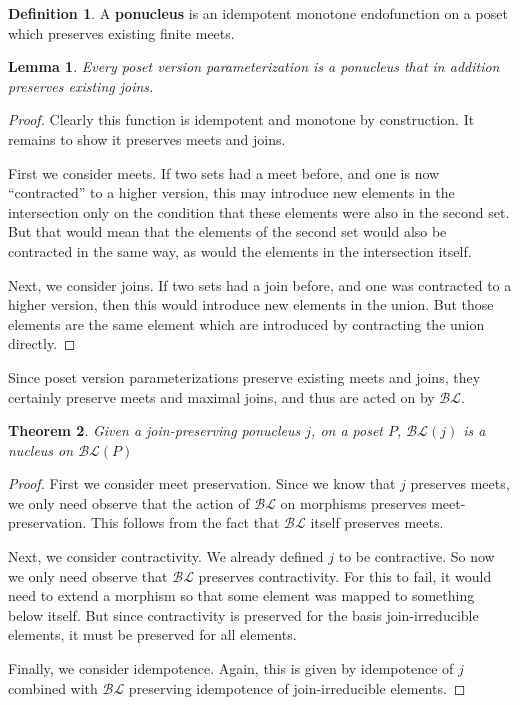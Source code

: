 \documentclass[hoptionsi,review,screen,format=sigconf]{acmart}
\newtheorem{theorem}{Theorem}[section]
\newtheorem{lemma}[theorem]{Lemma}
\theoremstyle{definition}
\newtheorem{definition}{Definition}[section]
\newcommand{\BLc}{\mathcal{BL}}
\begin{document}
\begin{definition}
A \textbf{ponucleus} is an idempotent monotone endofunction on a poset which preserves existing finite meets.
\end{definition}

\begin{lemma}
Every poset version parameterization is a ponucleus that in addition preserves existing joins.
\end{lemma}

\begin{proof}
Clearly this function is idempotent and monotone by construction. It remains to show it preserves meets and joins.

First we consider meets. If two sets had a meet before, and one is now ``contracted'' to a higher version, this may introduce new elements in the intersection only on the condition that these elements were also in the second set. But that would mean that the elements of the second set would also be contracted in the same way, as would the elements in the intersection itself.

Next, we consider joins. If two sets had a join before, and one was contracted to a higher version, then this would introduce new elements in the union. But those elements are the same element which are introduced by contracting the union directly.
\end{proof}

Since poset version parameterizations preserve existing meets and joins, they certainly preserve meets and maximal joins, and thus are acted on by \(\BLc\).

\begin{theorem}
Given a join-preserving ponucleus \(j\), on a poset \(P\),  \(\BLc(j)\) is a nucleus on \(\BLc(P)\)
\end{theorem}
\begin{proof}
First we consider meet preservation. Since we know that \(j\) preserves meets, we only need observe that the action of \(\BLc\) on morphisms preserves meet-preservation. This follows from the fact that \(\BLc\) itself preserves meets.


Next, we consider contractivity. We already defined \(j\) to be contractive. So now we only need observe that \(\BLc\) preserves contractivity. For this to fail, it would need to extend a morphism so that some element was mapped to something below itself. But since contractivity is preserved for the basis join-irreducible elements, it must be preserved for all elements.

Finally, we consider idempotence. Again, this is given by idempotence of \(j\) combined with \(\BLc\) preserving idempotence of join-irreducible elements.
\end{proof}
\end{document}
